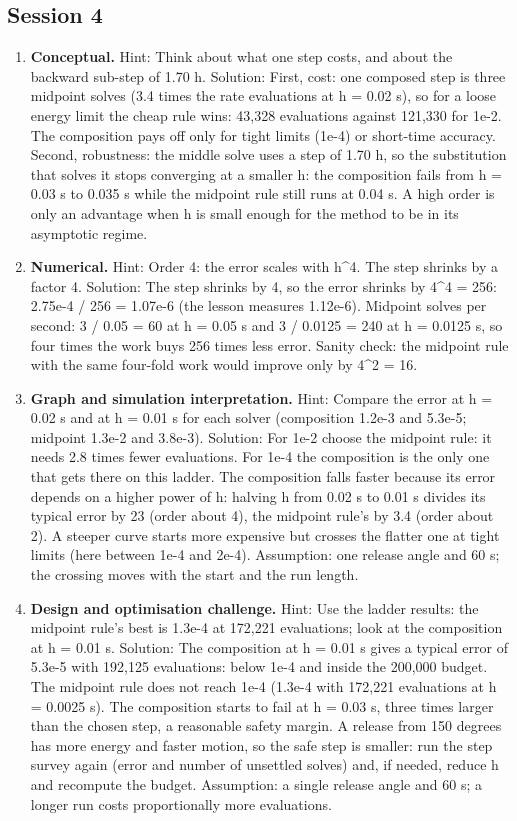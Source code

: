 \documentclass[11pt,a4paper]{article}
\begin{document}
\subsection*{Session 4}
\begin{enumerate}[nosep]
\item \textbf{Conceptual.} Hint: Think about what one step costs, and about the backward sub-step of 1.70 h. Solution: First, cost: one composed step is three midpoint solves (3.4 times the rate evaluations at h = 0.02 s), so for a loose energy limit the cheap rule wins: 43,328 evaluations against 121,330 for 1e-2. The composition pays off only for tight limits (1e-4) or short-time accuracy. Second, robustness: the middle solve uses a step of 1.70 h, so the substitution that solves it stops converging at a smaller h: the composition fails from h = 0.03 s to 0.035 s while the midpoint rule still runs at 0.04 s. A high order is only an advantage when h is small enough for the method to be in its asymptotic regime.
\item \textbf{Numerical.} Hint: Order 4: the error scales with h\textasciicircum{}4. The step shrinks by a factor 4. Solution: The step shrinks by 4, so the error shrinks by 4\textasciicircum{}4 = 256: 2.75e-4 / 256 = 1.07e-6 (the lesson measures 1.12e-6). Midpoint solves per second: 3 / 0.05 = 60 at h = 0.05 s and 3 / 0.0125 = 240 at h = 0.0125 s, so four times the work buys 256 times less error. Sanity check: the midpoint rule with the same four-fold work would improve only by 4\textasciicircum{}2 = 16.
\item \textbf{Graph and simulation interpretation.} Hint: Compare the error at h = 0.02 s and at h = 0.01 s for each solver (composition 1.2e-3 and 5.3e-5; midpoint 1.3e-2 and 3.8e-3). Solution: For 1e-2 choose the midpoint rule: it needs 2.8 times fewer evaluations. For 1e-4 the composition is the only one that gets there on this ladder. The composition falls faster because its error depends on a higher power of h: halving h from 0.02 s to 0.01 s divides its typical error by 23 (order about 4), the midpoint rule's by 3.4 (order about 2). A steeper curve starts more expensive but crosses the flatter one at tight limits (here between 1e-4 and 2e-4). Assumption: one release angle and 60 s; the crossing moves with the start and the run length.
\item \textbf{Design and optimisation challenge.} Hint: Use the ladder results: the midpoint rule's best is 1.3e-4 at 172,221 evaluations; look at the composition at h = 0.01 s. Solution: The composition at h = 0.01 s gives a typical error of 5.3e-5 with 192,125 evaluations: below 1e-4 and inside the 200,000 budget. The midpoint rule does not reach 1e-4 (1.3e-4 with 172,221 evaluations at h = 0.0025 s). The composition starts to fail at h = 0.03 s, three times larger than the chosen step, a reasonable safety margin. A release from 150 degrees has more energy and faster motion, so the safe step is smaller: run the step survey again (error and number of unsettled solves) and, if needed, reduce h and recompute the budget. Assumption: a single release angle and 60 s; a longer run costs proportionally more evaluations.
\end{enumerate}
\end{document}

